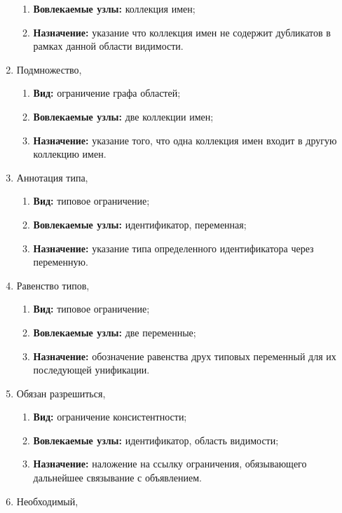 \begin{enumerate}
\begin{enumerate}
        \item \textbf{Вовлекаемые узлы:} коллекция имен;
        \item \textbf{Назначение:} указание что коллекция имен не содержит дубликатов
        в рамках данной области видимости.
    \end{enumerate}
    \item Подмножество,
    \begin{enumerate}
        \item \textbf{Вид:} ограничение графа областей;
        \item \textbf{Вовлекаемые узлы:} две коллекции имен;
        \item \textbf{Назначение:} указание того, что одна коллекция
        имен входит в другую коллекцию имен.
    \end{enumerate}
    \item Аннотация типа,
    \begin{enumerate}
        \item \textbf{Вид:} типовое ограничение;
        \item \textbf{Вовлекаемые узлы:} идентификатор, переменная;
        \item \textbf{Назначение:} указание типа определенного
        идентификатора через переменную.
    \end{enumerate}
    \item Равенство типов,
    \begin{enumerate}
        \item \textbf{Вид:} типовое ограничение;
        \item \textbf{Вовлекаемые узлы:} две переменные;
        \item \textbf{Назначение:} обозначение равенства друх типовых 
        переменный для их последующей унификации.
    \end{enumerate}
    \item Обязан разрешиться,
    \begin{enumerate}
        \item \textbf{Вид:} ограничение консистентности;
        \item \textbf{Вовлекаемые узлы:} идентификатор, область видимости;
        \item \textbf{Назначение:} наложение на ссылку ограничения, обязывающего дальнейшее
        связывание с объявлением.
    \end{enumerate}
    \item Необходимый,
    \begin{enumerate}

\end{enumerate}
\end{enumerate}
